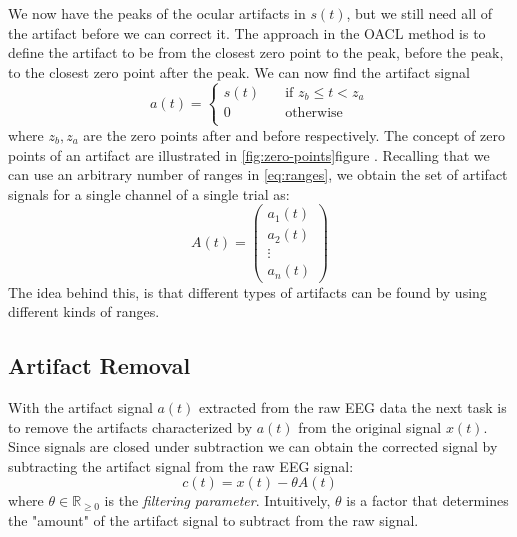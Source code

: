 We now have the peaks of the ocular artifacts in $s(t)$, but we still need all of the artifact before we can correct it. The approach in the OACL method is to define the artifact to be from the closest zero point to the peak, before the peak, to the closest zero point after the peak. We can now find the artifact signal 
\begin{equation}
\label{eq:artifactsignal}
a(t) =
\begin{cases}
s(t)      & \quad \text{if } z_b \leq t < z_a\\
0  & \quad \text{otherwise}\\
\end{cases}
\end{equation}
where $z_b, z_a$ are the zero points after and before respectively. The concept of zero points of an artifact are illustrated in \cref{fig:zero-points}figure .
Recalling that we can use an arbitrary number of ranges in \cref{eq:ranges}, we obtain the set of artifact signals for a single channel of a single trial as:
\begin{equation}\label{eq:artifact-signals}
A(t)=  \begin{pmatrix}
a_1(t) \\
a_2(t) \\
\vdots  \\
a_n(t) 
\end{pmatrix}
\end{equation}
The idea behind this, is that different types of artifacts can be found by using different kinds of ranges. 
\subsection{Artifact Removal}
With the artifact signal $a(t)$ extracted from the raw EEG data the next task is to remove the artifacts characterized by $a(t)$ from the original signal $x(t)$. Since signals are closed under subtraction we can obtain the corrected signal by subtracting the artifact signal from the raw EEG signal:
\begin{equation}\label{eq:corrected-signal}
c(t) = x(t) - \theta A(t)
\end{equation}
where $\theta \in \mathbb{R}_{\geq 0}$ is the \emph{filtering parameter}. Intuitively, $\theta$ is a factor that determines the "amount" of the artifact signal to subtract from the raw signal. 

